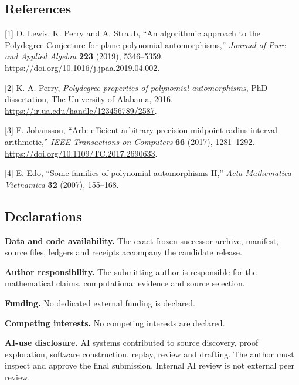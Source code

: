 \documentclass[
  11pt,
  a4paper,
]{article}
\begin{document}
\subsection{References}\label{references}

{[}1{]} D. Lewis, K. Perry and A. Straub, ``An algorithmic approach to
the Polydegree Conjecture for plane polynomial automorphisms,''
\emph{Journal of Pure and Applied Algebra} \textbf{223} (2019),
5346--5359. \url{https://doi.org/10.1016/j.jpaa.2019.04.002}.

{[}2{]} K. A. Perry, \emph{Polydegree properties of polynomial
automorphisms}, PhD dissertation, The University of Alabama, 2016.
\url{https://ir.ua.edu/handle/123456789/2587}.

{[}3{]} F. Johansson, ``Arb: efficient arbitrary-precision
midpoint-radius interval arithmetic,'' \emph{IEEE Transactions on
Computers} \textbf{66} (2017), 1281--1292.
\url{https://doi.org/10.1109/TC.2017.2690633}.

{[}4{]} E. Edo, ``Some families of polynomial automorphisms II,''
\emph{Acta Mathematica Vietnamica} \textbf{32} (2007), 155--168.

\subsection{Declarations}\label{declarations}

\textbf{Data and code availability.} The exact frozen successor archive,
manifest, source files, ledgers and receipts accompany the candidate
release.

\textbf{Author responsibility.} The submitting author is responsible for
the mathematical claims, computational evidence and source selection.

\textbf{Funding.} No dedicated external funding is declared.

\textbf{Competing interests.} No competing interests are declared.

\textbf{AI-use disclosure.} AI systems contributed to source discovery,
proof exploration, software construction, replay, review and drafting.
The author must inspect and approve the final submission. Internal AI
review is not external peer review.
\end{document}
